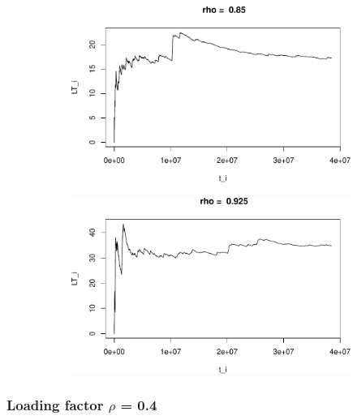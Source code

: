 \documentclass[]{article}
\begin{document}
\begin{figure}[h!]
\begin{subfigure}[b]{.55\linewidth}
\includegraphics[width=\linewidth]{003_files/figure-latex/unnamed-chunk-11-3.pdf}
\end{subfigure}\hfill
\begin{subfigure}[b]{.55\linewidth}
\includegraphics[width=\linewidth]{003_files/figure-latex/unnamed-chunk-11-4.pdf}
\end{subfigure}\vfill
\end{figure}





\subsubsection{\texorpdfstring{Loading factor \(\rho\) =
0.4}{Loading factor \textbackslash{}rho = 0.4}}\label{loading-factor-rho-0.4}
\end{document}
